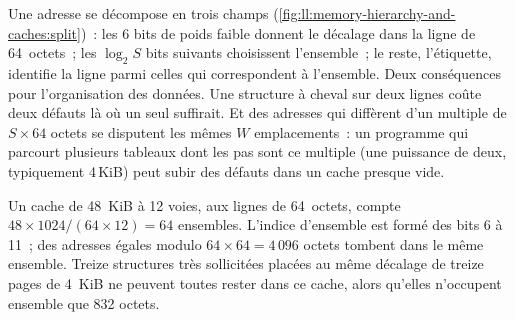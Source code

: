 Une adresse se décompose en trois champs (\cref{fig:ll:memory-hierarchy-and-caches:split})~: les 6 bits de poids faible donnent le décalage
dans la ligne de 64~octets~; les $\log_2 S$ bits suivants choisissent l'ensemble~; le reste, l'étiquette, identifie la ligne parmi celles qui
correspondent à l'ensemble. Deux conséquences pour l'organisation des données. Une structure à cheval sur deux lignes coûte deux défauts là où un seul
suffirait. Et des adresses qui diffèrent d'un multiple de $S \times 64$ octets se disputent les mêmes $W$ emplacements~: un programme qui parcourt
plusieurs tableaux dont les pas sont ce multiple (une puissance de deux, typiquement 4\,KiB) peut subir des défauts dans un cache
presque vide.

\begin{omfigure}

\label{fig:ll:memory-hierarchy-and-caches:split}
\end{omfigure}

\begin{example}\label{ex:ll:memory-hierarchy-and-caches:geometry}
Un cache de 48~KiB à 12 voies, aux lignes de 64~octets, compte $48 \times 1024 / (64 \times 12) = 64$ ensembles. L'indice d'ensemble est formé des bits 6 à
11~; des adresses égales modulo $64 \times 64 = 4\,096$ octets tombent dans le même ensemble. Treize structures très sollicitées placées
au même décalage de treize pages de 4~KiB ne peuvent toutes rester dans ce cache, alors qu'elles n'occupent ensemble que 832 octets.
\end{example}

